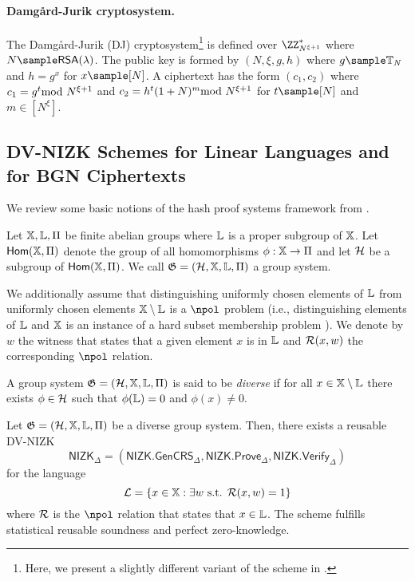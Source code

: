 \paragraph{Damg\r{a}rd-Jurik cryptosystem.} The Damg\r{a}rd-Jurik (DJ) cryptosystem\footnote{Here, we present a slightly different variant of the scheme in \cite{PKC:DamJur01}.} \cite{PKC:DamJur01} is defined over $\ZZ^\ast_{N^{\xi+1}}$ where $N\sample \mathsf{RSA}(\lambda)$. The public key is formed by $(N,\xi,g,h)$ where $g\sample \TT_N$ and $h=g^x$ for $x\sample [N]$. A ciphertext has the form $(c_1,c_2)$ where $c_1=g^t\!\!\!\!\mod N^{\xi+1}$ and $c_2=h^t(1+N)^m\!\!\!\!\mod N^{\xi+1}$ for $t\sample [N]$ and $m\in [N^\xi]$.


\subsection{DV-NIZK Schemes for Linear Languages and for BGN Ciphertexts}

We review some basic notions of the hash proof systems framework from \cite{EC:CraSho02}.

Let $\mathbb{X},\mathbb{L},\Pi$ be finite abelian groups where $\mathbb{L}$ is a proper subgroup of $\mathbb{X}$. Let $\mathsf{Hom}(\mathbb{X},\Pi)$ denote the group of all homomorphisms $\phi:\mathbb{X}\to\Pi$ and let $\mathcal{H}$ be a subgroup of $\mathsf{Hom}(\mathbb{X},\Pi)$. We call $\mathfrak{G}=(\mathcal{H},\mathbb{X},\mathbb{L},\Pi)$ a group system. 

We additionally assume that distinguishing uniformly chosen elements of $\mathbb{L}$ from uniformly chosen elements $\mathbb{X}\setminus \mathbb{L}$ is a $\npol$ problem (i.e., distinguishing elements of $\mathbb{L}$ and $\mathbb{X}$ is an instance of a hard subset membership problem \cite{EC:CraSho02}). We denote by $w$ the witness that states that a given element $x $ is in $\mathbb{L}$ and $\mathcal{R}(x,w)$ the corresponding $\npol$ relation.

A group system $\mathfrak{G}=(\mathcal{H},\mathbb{X},\mathbb{L},\Pi)$ is said to be \emph{diverse} if for all $x\in\mathbb{X}\setminus \mathbb{L}$ there exists $\phi\in\mathcal{H}$ such that $\phi(\mathbb{L})=0$ and  $\phi(x)\neq 0$.


\begin{lemma}
Let $\mathfrak{G}=(\mathcal{H},\mathbb{X},\mathbb{L},\Pi)$ be a diverse group system. Then, there exists a reusable DV-NIZK $$\mathsf{NIZK}_{\Delta}=(\mathsf{NIZK.GenCRS}_{\Delta},\mathsf{NIZK.Prove}_{\Delta},\mathsf{NIZK.Verify}_{\Delta})$$ for the language $$\mathcal{L}=\left\{x\in\mathbb{X}:\exists w \text{ s.t. } \mathcal{R}(x,w)=1\right\}$$ where $\mathcal{R}$ is the $\npol$ relation that states that $x\in\mathbb{L}$. The scheme fulfills statistical reusable soundness and perfect zero-knowledge.
\end{lemma}



